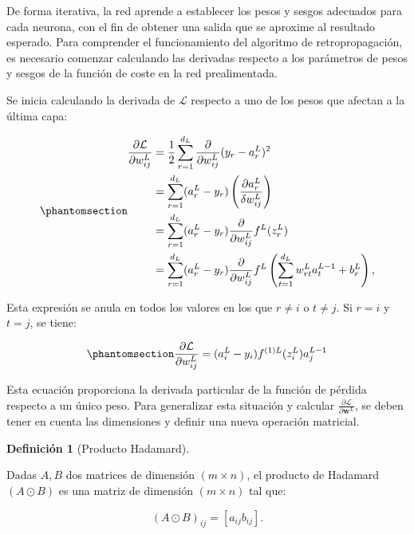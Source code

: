 \documentclass[
  us-letterpaper,
]{scrreprt}
\theoremstyle{definition}
\theoremstyle{plain}
\theoremstyle{plain}
\theoremstyle{definition}
\newtheorem{definition}{Definición}[chapter]
\theoremstyle{remark}
\begin{document}
De forma iterativa, la red aprende a establecer los pesos y sesgos
adecuados para cada neurona, con el fin de obtener una salida que se
aproxime al resultado esperado. Para comprender el funcionamiento del
algoritmo de retropropagación, es necesario comenzar calculando las
derivadas respecto a los parámetros de pesos y sesgos de la función de
coste en la red prealimentada.

Se inicia calculando la derivada de \(\mathcal L\) respecto a uno de los
pesos que afectan a la última capa:

\begin{equation}\phantomsection\label{eq-18}{\begin{split}\frac{\partial \mathcal L}{\partial w_{ij}^L} &= \frac{1}{2} \sum_{r=1}^{d_L} \frac{\partial}{\partial w_{ij}^L} (y_r - a_{r}^L)^2\\
 &= \sum_{r=1}^{d_L} (a_{r}^L - y_r) \left(\frac{\partial a_r^L}{\delta w_{ij}^L}\right)\\
 &=\sum_{r=1}^{d_L} (a_{r}^L - y_r) \frac{\partial}{\partial w_{ij}^L}f^L(z_{r}^L)\\
&= \sum_{r=1}^{d_L} (a_{r}^L - y_r) \frac{\partial}{\partial w_{ij}^L}f^L\left(\sum_{t=1}^{d_L}w_{rt}^La_t^{L-1}+b_r^L\right),\end{split}}\end{equation}

Esta expresión se anula en todos los valores en los que \(r\neq i\) o
\(t\neq j\). Si \(r = i\) y \(t = j\), se tiene:

\begin{equation}\phantomsection\label{eq-retrop}{\frac{\partial \mathcal L}{\partial w_{ij}^L} = (a_{i}^L - y_i) f^{(1)L}(z_{i}^L) a_j^{L-1}}\end{equation}

Esta ecuación proporciona la derivada particular de la función de
pérdida respecto a un único peso. Para generalizar esta situación y
calcular \(\frac{\partial \mathcal L}{\partial \mathbf w^{L}}\), se
deben tener en cuenta las dimensiones y definir una nueva operación
matricial.

\begin{definition}[Producto
Hadamard]\protect\hypertarget{def-pHada}{}\label{def-pHada}

Dadas \(A, B\) dos matrices de dimensión \((m\times n)\), el producto de
Hadamard \((A\odot B)\) es una matriz de dimensión \((m\times n)\) tal
que:

\[
(A\odot B)_{ij}=[a_{ij}b_{ij}].
\]

\end{definition}
\end{document}
